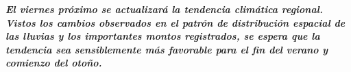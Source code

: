\emph{\textbf{El viernes próximo se actualizará la tendencia climática
regional. Vistos los cambios observados en el patrón de distribución
espacial de las lluvias y los importantes montos registrados, se espera
que la tendencia sea sensiblemente más favorable para el fin del verano
y comienzo del otoño.}}
